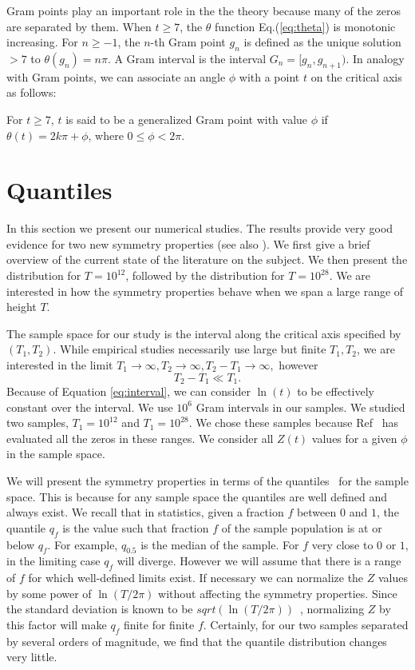 \documentclass[twoside]{article}
\begin{document}
Gram points play an important role in the the theory because many of the zeros are separated by them.  When $t \ge 7$, the $\theta$ function Eq.(\ref{eq:theta}) is monotonic increasing. 
For $n \ge -1$, the $n$-th Gram point $g_n$ is defined as the unique solution $> 7$ to
$\theta (g_n) = n\pi$. A Gram interval is the interval $G_n = [g_n,g_{n+1})$.
 In analogy with Gram points, we can associate an angle $\phi$ with a point $t$ on the critical axis as follows:
\begin{definition}\label{phi}
For $t \ge 7$, $t$ is said to be a generalized Gram point with value $\phi$  if
$\theta (t) = 2k\pi + \phi$, where $0 \le \phi < 2\pi$.
\end{definition}


\section{\label{sec3}Quantiles}
In this section we present our numerical studies. The results provide very good evidence for two new symmetry properties (see also \cite{Shanker 2018b}).
We first give a brief overview of the current state of the literature on the subject. We then present the distribution for $T=10^{12}$, followed by the distribution for $T=10^{28}$. We are interested in how the symmetry properties behave when we span a large range of height $T$.

The sample space for our study is the interval along the critical axis specified by $(T_1, T_2)$. While empirical studies necessarily use large but finite  $T_1, T_2$, we are interested in the limit 
$T_1 \rightarrow \infty, T_2 \rightarrow \infty,  T_2-T_1 \rightarrow \infty,$ however
\begin{equation}
T_2 - T_1  \ll T_1. 
\label{eq:interval}
\end{equation}
Because of Equation \ref{eq:interval}, we can consider  $\ln (t)$  to be effectively constant over  the interval.
We use
$10^6$ Gram intervals in our samples. We studied  two samples, $T_1=10^{12}$ and  $T_1=10^{28}$. We chose these samples because  Ref~\cite{hiary 2010} has evaluated all the zeros in these ranges. We consider all $Z(t)$ values for a given $\phi$ in the sample space.

We will present the symmetry properties in terms of the quantiles~\cite{Feller 1971} for the sample space. This is because for any sample space the quantiles are well defined and always exist. We recall that in statistics, given a fraction $f$ between $0$ and $1$, the quantile $q_f$ is the value such that fraction $f$  of the sample population is at or below $q_f$. For example, $q_{0.5}$ is the median of the sample.
For $f$ very close to $0$ or $1$, in the limiting case $q_f$ will diverge. However we will assume that there is a range of $f$ for which well-defined limits exist. If necessary we can normalize the $Z$ values by some power of $\ln(T/2\pi)$ without affecting the symmetry properties. Since the standard deviation is known to be $sqrt(\ln(T/2\pi))$~\cite{Shanker 2018b}, normalizing $Z$ by this factor will make $q_f$ finite for finite $f$. Certainly, for our two samples separated by several orders of magnitude, we find that the quantile distribution changes very little. 
\end{document}
